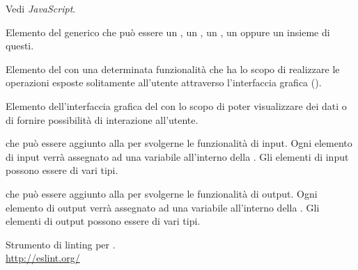 Vedi \textit{JavaScript}.

Elemento del  generico che può essere un , un , un , un  oppure un insieme di questi.

Elemento del  con una determinata funzionalità che ha lo scopo di realizzare le operazioni esposte solitamente all'utente attraverso l’interfaccia grafica ().

Elemento dell’interfaccia grafica del  con lo scopo di poter visualizzare dei dati o di fornire possibilità di interazione all’utente.

 che può essere aggiunto alla  per svolgerne le funzionalità di input. Ogni elemento di input verrà assegnato ad una variabile all’interno della . Gli elementi di input possono essere di vari tipi.

 che può essere aggiunto alla  per svolgerne le funzionalità di output. Ogni elemento di output verrà assegnato ad una variabile all’interno della . Gli elementi di output possono essere di vari tipi.

Strumento di linting per .\\
\url{http://eslint.org/}
\clearpage